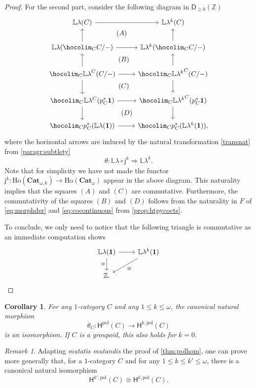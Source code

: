 \documentclass[reqno]{amsart}
\theoremstyle{plain}
\newtheorem{corollary}[subsubsection]{Corollary}
\theoremstyle{definition}
\theoremstyle{remark}
\newtheorem{remark}[subsubsection]{Remark}
\newcommand{\nmbr}[1]{\mathbb #1}
\newcommand{\Z}{\nmbr{Z}}
\newcommand{\fun}[2]{{#2}^{#1}} %
\newcommand{\tr}[2]{#1/#2} %
\newcommand{\ctg}[1]{\mathbf{#1}}  %
\newcommand{\Cat}{\ctg{Cat}}   %
\newcommand{\nCat}[1]{\Cat_{#1}}  %
\newcommand{\opCat}[1]{\Cat_{\omega,#1}} %
\newcommand{\oCat}{\nCat{\omega}} %
\newcommand{\Term}{\ctg{1}} %
\newcommand{\functor}[1]{\mathsf{#1}} %
\newcommand{\emb}[2]{\functor{j}_{#2}^{#1}}%
\newcommand{\oemb}[1]{\emb{#1}{}}%
\newcommand{\abel}{\functor{\lambda}} %
\newcommand{\abelk}[1]{\functor{\abel}^{#1}}%
\newcommand{\homnat}{\theta}%
\newcommand{\oo}{\ensuremath{\omega}}
\newcommand{\Ho}{\functor{H}} %
\newcommand{\LL}{\mathbb{L}} %
\newcommand{\Hop}[1]{\Ho^{#1,\mathrm{pol}}} %
\newcommand{\Hopol}{\Ho^{\mathrm{pol}}}%
\newcommand{\Derp}[1]{\functor{D}_{\geq 0}(#1)}
\newcommand{\Loc}[1]{\mathrm{Ho}(#1)} %
\newcommand{\nbd}{\nobreakdash} %
\begin{document}
\begin{proof}
  For the second part, consider the following diagram in $\Derp{\Z}$
  \[
    \begin{tikzcd}
      \LL\abel(C)\ar[r] & \LL\abelk{k}(C)\\
       \LL\abel(\hocolim_{C}\tr{C}{-})\ar[r]\ar[u]&
       \LL\abelk{k}(\hocolim_{C}\tr{C}{-})\ar[u]\\
       \hocolim_{C}\fun{C}{\LL
     \abel}(\tr{C}{-})\ar[r] \ar[u]\ar[d]& \hocolim_{C}\fun{C}{\LL
     \abelk{k}}(\tr{C}{-})\ar[u]\ar[d]\\
   \hocolim_{C}\LL \fun{C}{\abel}(p_C^*\Term)\ar[r] \ar[d]& \hocolim_{C}\LL
   \fun{C}{\abelk{k}}(p_C^*\Term)\ar[d] \\
    \hocolim_{C}p^*_C(\LL \abel(\Term))\ar[r]& \hocolim_{C}p^*_C(\LL
    \abelk{k}(\Term)),
    \ar[from=1-1,to=2-2,phantom,description, "(A)"]
    \ar[from=2-1,to=3-2,phantom,description,"(B)"]
    \ar[from=3-1,to=4-2,phantom,description,"(C)"]
    \ar[from=4-1,to=5-2,phantom,description,"(D)"]
  \end{tikzcd}
\]
where the horizontal arrows are induced by the natural transformation
\eqref{transnat} from \cref{paragr:subtlety}
\[
    \homnat \colon \LL \abel\circ \oemb{k} \Rightarrow \LL \abelk{k}.
  \]
  Note that for simplicity we have not made the functor
  $\oemb{k} \colon \Loc{\opCat{k}}\to \Loc{\oCat}$ appear in the above
  diagram. This naturality implies that the squares $(A)$ and $(C)$ are
  commutative. Furthermore, the commutativity of the squares $(B)$ and
  $(D)$ follows from the naturality in $F$ of \eqref{eq:morphder} and
  \eqref{eq:cocontinuous} from \cref{prop:htpycocts}.

  To conclude, we only need to notice that the following triangle is
  commutative as an immediate computation shows
  \[
    \begin{tikzcd}
      \LL \abel(\Term) \ar[d,"\cong"']\ar[r] & \LL \abelk{k}(\Term)\ar[dl,"\cong"]\\
      \Z.&
    \end{tikzcd}
  \]
\end{proof}
\begin{corollary}
  For any $1$\nbd-category $C$ and any $1 \leq k \leq \oo$, the
  canonical natural morphism
  \[
   \homnat_C \colon \Hopol(C) \to \Hop{k}(C)
  \]
  is an isomorphism. If $C$ is a groupoid, this also holds for $k=0$.
\end{corollary}
\begin{remark}
  Adapting \emph{mutatis mutandis} the proof of
  \cref{thm:polhom}, one can prove more generally that, for a
  $1$-category $C$ and for any $1 \leq k \leq k' \leq \oo$, there is a canonical natural isomorphism
  \[
     \Hop{k'\!}(C)\cong  \Hop{k}(C).
  \]
\end{remark}
\end{document}
